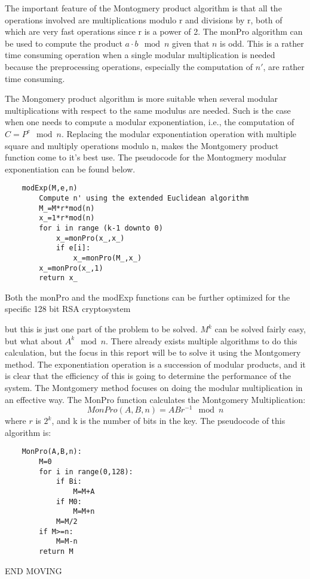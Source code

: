 %
The important feature of the Montogmery product algorithm is that all the operations involved are multiplications modulo r and divisions by r, both of which are very fast operations since r is a power of 2. The monPro algorithm can be used to compute the product $a \cdot b \mod{n}$ given that $n$ is odd. This is a rather time consuming operation when a single modular multiplication is needed because the preprocessing operations, especially the computation of $n'$, are rather time consuming.

The Mongomery product algorithm is more suitable when several modular multiplications with respect to the same modulus are needed. Such is the case when one needs to compute a modular exponentiation, i.e., the computation of $C=P^e\mod{n}$. Replacing the modular exponentiation operation with multiple square and multiply operations modulo n, makes the Montgomery product function come to it's best use. The pseudocode for the Montogmery modular exponentiation can be found below.
\begin{lstlisting}
    modExp(M,e,n) 
        Compute n' using the extended Euclidean algorithm
        M_=M*r*mod(n)
        x_=1*r*mod(n)
        for i in range (k-1 downto 0)
            x_=monPro(x_,x_)
            if e[i]:
                x_=monPro(M_,x_)
        x_=monPro(x_,1)
        return x_
\end{lstlisting}
%
Both the monPro and the modExp functions can be further optimized for the specific 128 bit RSA cryptosystem 

but this is just one part of the problem to be solved. $M^k$ can be solved fairly easy, but what about $A^k \mod{n}$. There already exists multiple algorithms to do this calculation, but the focus in this report will be to solve it using the Montgomery method. The exponentiation operation is a succession of modular products, and it is clear that the efficiency of this is going to determine the performance of the system. The Montgomery method focuses on doing the modular multiplication in an effective way. The MonPro function calculates the Montgomery Multiplication:
\begin{equation}
    MonPro(A,B,n)=ABr^{-1}\mod{n}
\end{equation}
where $r$ is $2^k$, and k is the number of bits in the key. The pseudocode of this algorithm is:
\begin{lstlisting}
    MonPro(A,B,n):
        M=0
        for i in range(0,128):
            if Bi:
                M=M+A
            if M0:
                M=M+n
            M=M/2
        if M>=n:
            M=M-n
        return M
\end{lstlisting}
END MOVING
